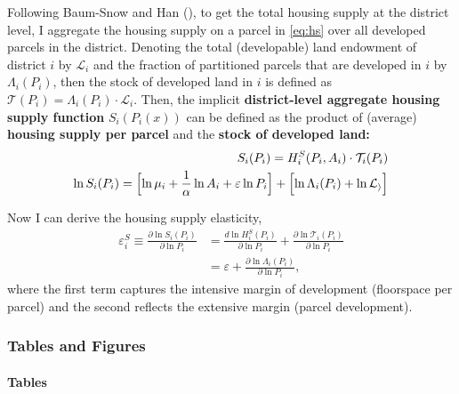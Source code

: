 \documentclass[
  12pt,
]{article}
\begin{document}
Following Baum-Snow and Han (), to get the total housing supply at the district level, I aggregate the housing supply on a parcel in \eqref{eq:hs} over all developed parcels in the district. Denoting the total (developable) land endowment of district \(i\) by \(\mathcal{L}_{i}\) and the fraction of partitioned parcels that are developed in \(i\) by \(\Lambda_i (P_i)\), then the stock of developed land in \(i\) is defined as \(\mathcal{T}(P_i) = \Lambda_i(P_i) \cdot \mathcal{L}_{i}\). Then, the implicit \textbf{district-level aggregate housing supply function} \(S_i(P_i(x))\) can be defined as the product of (average) \textbf{housing supply per parcel} and the \textbf{stock of developed land:} \begin{equation}
\begin{aligned}
S_i(P_i) = H_i^S(P_i, A_i)\cdot \mathcal{T}_{i}(P_i)\\ 
\ln S_i(P_i) = \Bigl[\ln \mu_i + \frac{1}{\alpha}\ln A_i + \varepsilon\ln P_i \Bigr]+ \Bigl[\ln\Lambda_i(P_i) + \ln\mathcal{L_i}\Bigr]
\end{aligned}
\label{eq:app-agg-hs}
\end{equation}

Now I can derive the housing supply elasticity, \begin{equation}
\begin{aligned}
\varepsilon^S_{i} \equiv \frac{\partial \ln S_{i}\left(P_{i}\right)}{\partial \ln P_{i}}&=\frac{d \ln H^S_{i}\left(P_{i}\right)}{\partial \ln P_{i}}+ \frac{\partial \ln \mathcal{T}_{i}\left(P_{i}\right)}{\partial \ln P_{i}} \\
&= \varepsilon + \frac{\partial \ln\Lambda_i(P_i)}{\partial \ln P_i},
\end{aligned}
\label{eq:app-elasticity}
\end{equation} where the first term captures the intensive margin of development (floorspace per parcel) and the second reflects the extensive margin (parcel development).

\subsubsection{Tables and Figures}\label{tables-and-figures}

\paragraph{Tables}\label{tables}
\end{document}
